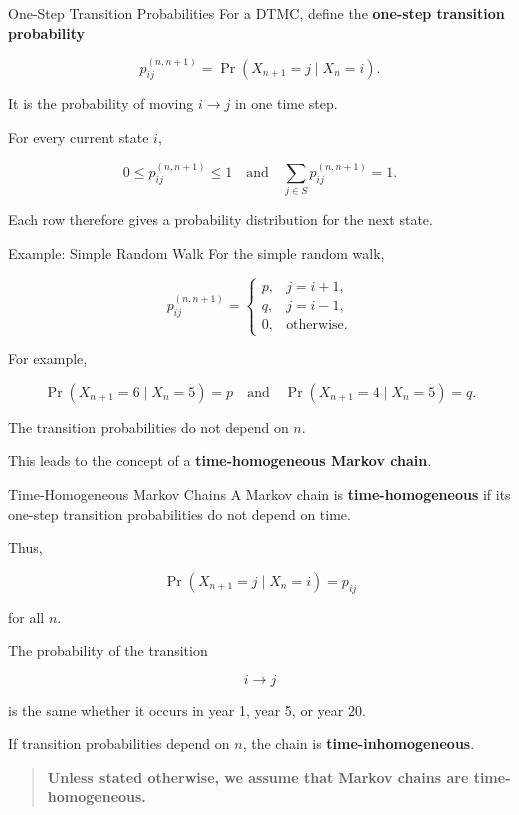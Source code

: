 \documentclass[
  ignorenonframetext,
  aspectratio=169,
]{beamer}
\begin{document}
\begin{frame}{One-Step Transition Probabilities}
\protect{}\label{one-step-transition-probabilities}
For a DTMC, define the \textbf{one-step transition probability}

\[
\boxed{
p_{ij}^{(n,n+1)}
=\Pr(X_{n+1}=j\mid X_n=i).
}
\]

It is the probability of moving \(\boxed{i\longrightarrow j}\) in one
time step.

For every current state \(i\),

\[
0\leq p_{ij}^{(n,n+1)}\leq1    \quad \text{and} \quad   \boxed{
\sum_{j\in S}p_{ij}^{(n,n+1)}=1.
} 
\]

Each row therefore gives a probability distribution for the next state.
\end{frame}

\begin{frame}{Example: Simple Random Walk}
\protect{}\label{example-simple-random-walk}
For the simple random walk,

\[
p_{ij}^{(n,n+1)}
=\begin{cases}
p, & j=i+1,\\
q, & j=i-1,\\
0, & \text{otherwise}.
\end{cases}
\]

For example,

\[
\Pr(X_{n+1}=6\mid X_n=5)=p \quad \text{and} \quad  \Pr(X_{n+1}=4\mid X_n=5)=q.
\]

The transition probabilities do not depend on \(n\).

This leads to the concept of a \textbf{time-homogeneous Markov chain}.
\end{frame}

\begin{frame}{Time-Homogeneous Markov Chains}
\protect{}\label{time-homogeneous-markov-chains}
A Markov chain is \textbf{time-homogeneous} if its one-step transition
probabilities do not depend on time.

Thus,

\[
\boxed{
\Pr(X_{n+1}=j\mid X_n=i)=p_{ij}
}
\]

for all \(n\).

The probability of the transition

\[
i\longrightarrow j
\]

is the same whether it occurs in year 1, year 5, or year 20.

If transition probabilities depend on \(n\), the chain is
\textbf{time-inhomogeneous}.

\begin{quote}
\textbf{Unless stated otherwise, we assume that Markov chains are
time-homogeneous.}
\end{quote}
\end{frame}
\end{document}
